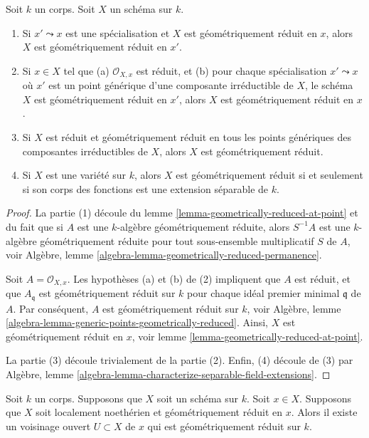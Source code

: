 \begin{lemma}
\label{lemma-generic-points-geometrically-reduced}
Soit $k$ un corps.
Soit $X$ un schéma sur $k$.
\begin{enumerate}
\item Si $x' \leadsto x$ est une spécialisation et $X$
est géométriquement réduit en $x$, alors $X$ est
géométriquement réduit en $x'$. \item Si $x \in X$ tel
que (a) $\mathcal{O}_{X, x}$ est réduit, et (b) pour
chaque spécialisation $x' \leadsto x$ où $x'$ est un
point générique d'une composante irréductible de $X$, le
schéma $X$ est géométriquement réduit en $x'$, alors $X$
est géométriquement réduit en $x$. \item Si $X$ est
réduit et géométriquement réduit en tous les points
génériques des composantes irréductibles de $X$, alors $X$
est géométriquement réduit. \item Si $X$ est une variété sur
$k$, alors $X$ est géométriquement réduit si et seulement si
son corps des fonctions est une extension séparable de $k$.
\end{enumerate}
\end{lemma}

\begin{proof}
La partie (1) découle du lemme
\ref{lemma-geometrically-reduced-at-point} et du fait que
si $A$ est une $k$-algèbre géométriquement réduite, alors
$S^{-1}A$ est une $k$-algèbre géométriquement réduite pour
tout sous-ensemble multiplicatif $S$ de $A$, voir Algèbre,
lemme \ref{algebra-lemma-geometrically-reduced-permanence}.

\medskip\noindent
Soit $A = \mathcal{O}_{X, x}$. Les hypothèses (a) et (b) de (2)
impliquent que $A$ est réduit, et que $A_{\mathfrak q}$ est
géométriquement réduit sur $k$ pour chaque idéal premier minimal
$\mathfrak q$ de $A$. Par conséquent, $A$ est géométriquement
réduit sur $k$, voir Algèbre, lemme
\ref{algebra-lemma-generic-points-geometrically-reduced}. Ainsi, $X$ est
géométriquement réduit en $x$, voir lemme \ref{lemma-geometrically-reduced-at-point}.

\medskip\noindent
La partie (3) découle trivialement de la partie (2).
Enfin, (4) découle de (3) par Algèbre, lemme
\ref{algebra-lemma-characterize-separable-field-extensions}.
\end{proof}

\begin{lemma}
\label{lemma-Noetherian-geometrically-reduced-at-point}
Soit $k$ un corps. Supposons
que $X$ soit un schéma sur $k$. Soit $x \in
X$. Supposons que $X$ soit localement
noethérien et géométriquement réduit en $x$.
Alors il existe un voisinage ouvert $U \subset
X$ de $x$ qui est géométriquement réduit sur $k$.
\end{lemma}

